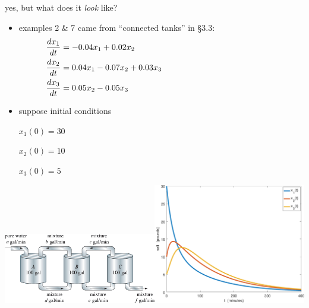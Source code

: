 \documentclass[urlcolor=blue,dvipsnames]{beamer}
\begin{document}
\begin{frame}{yes, but what does it \emph{look} like?}

\begin{itemize}
\item examples 2 \& 7 came from ``connected tanks'' in \S3.3:
\small
\begin{align*}
\frac{dx_1}{dt} &= -0.04 x_1 + 0.02 x_2 \hspace{60mm} \\
\frac{dx_2}{dt} &= 0.04 x_1 - 0.07 x_2 + 0.03 x_3 \\
\frac{dx_3}{dt} &= 0.05 x_2 - 0.05 x_3
\end{align*}
\normalsize
\item suppose initial conditions

\small $x_1(0)=30$ 

$x_2(0)=10$

$x_3(0)=5$
\end{itemize}

\vspace{-15mm}
\mbox{\includegraphics[width=0.5\textwidth]{figs/three-tanks}\quad \includegraphics[width=0.5\textwidth]{figs/brines-xvt}}
\end{frame}
\end{document}
